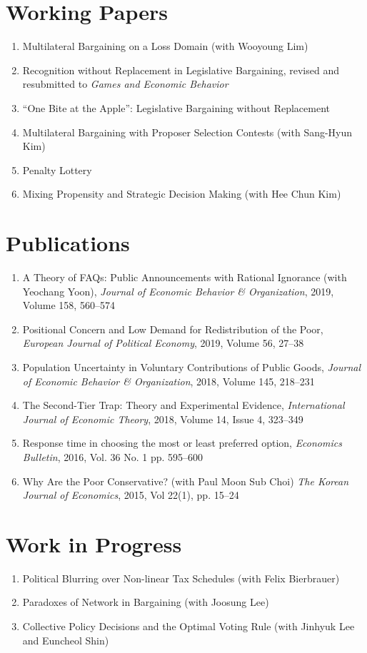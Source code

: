 \documentclass[margin, letterpaper]{res}
\begin{document}
\begin{resume}
\section{Working Papers}
\begin{enumerate}
\item Multilateral Bargaining on a Loss Domain (with Wooyoung Lim)
\item Recognition without Replacement in Legislative Bargaining, revised and resubmitted to \emph{Games and Economic Behavior}
\item ``One Bite at the Apple'': Legislative Bargaining without Replacement
\item Multilateral Bargaining with Proposer Selection Contests (with Sang-Hyun Kim)
\item Penalty Lottery
\item Mixing Propensity and Strategic Decision Making (with Hee Chun Kim)
\end{enumerate}

\section{Publications}
\begin{enumerate}
\item A Theory of FAQs: Public Announcements with Rational Ignorance (with Yeochang Yoon), \emph{Journal of Economic Behavior \& Organization}, 2019, Volume 158, 560--574
\item Positional Concern and Low Demand for Redistribution of the Poor, \emph{European Journal of Political Economy}, 2019, Volume 56, 27--38
\item Population Uncertainty in Voluntary Contributions of Public Goods, \emph{Journal of Economic Behavior \& Organization}, 2018, Volume 145, 218--231
\item The Second-Tier Trap: Theory and Experimental Evidence, \emph{International Journal of Economic Theory}, 2018, Volume 14, Issue 4, 323--349
\item Response time in choosing the most or least preferred option, \textit{Economics Bulletin}, 2016, Vol. 36 No. 1 pp. 595--600
\item Why Are the Poor Conservative? (with Paul Moon Sub Choi) \textit{The Korean Journal of Economics}, 2015, Vol 22(1), pp. 15--24
\end{enumerate}

\section{Work in Progress}
\begin{enumerate}
\item Political Blurring over Non-linear Tax Schedules (with Felix Bierbrauer)
\item Paradoxes of Network in Bargaining (with Joosung Lee)
\item Collective Policy Decisions and the Optimal Voting Rule (with Jinhyuk Lee and Euncheol Shin)
\end{enumerate}


\end{resume}
\end{document}
